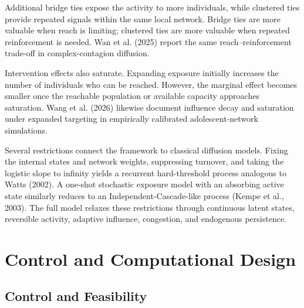 \documentclass[11pt]{article}
\begin{document}
Additional bridge ties expose the activity to more individuals, while clustered ties provide repeated signals within the same local network. Bridge ties are more valuable when reach is limiting; clustered ties are more valuable when repeated reinforcement is needed. Wan et al. (2025) report the same reach–reinforcement trade-off in complex-contagion diffusion. 

Intervention effects also saturate. Expanding exposure initially increases the number of individuals who can be reached. However, the marginal effect becomes smaller once the reachable population or available capacity approaches saturation. Wang et al. (2026) likewise document influence decay and saturation under expanded targeting in empirically calibrated adolescent-network simulations. 

Several restrictions connect the framework to classical diffusion models. Fixing the internal states and network weights, suppressing turnover, and taking the logistic slope to infinity yields a recurrent hard-threshold process analogous to Watts (2002). A one-shot stochastic exposure model with an absorbing active state similarly reduces to an Independent-Cascade-like process (Kempe et al., 2003). The full model relaxes these restrictions through continuous latent states, reversible activity, adaptive influence, congestion, and endogenous persistence.

\section{Control and Computational Design}

\subsection{Control and Feasibility}
\end{document}
